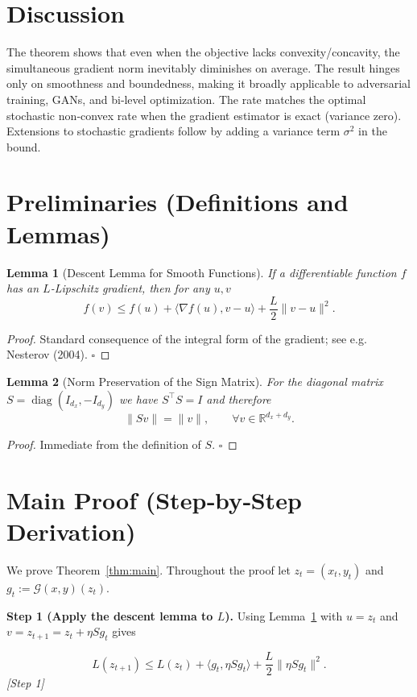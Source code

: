 \documentclass{article}
\newtheorem{lemma}{Lemma}
\newcommand{\G}{\mathcal{G}(x,y)}
\begin{document}
\section*{Discussion}
The theorem shows that even when the objective lacks convexity/concavity, the simultaneous gradient norm inevitably diminishes on average. The result hinges only on smoothness and boundedness, making it broadly applicable to adversarial training, GANs, and bi‑level optimization. The rate matches the optimal stochastic non‑convex rate when the gradient estimator is exact (variance zero). Extensions to stochastic gradients follow by adding a variance term \(\sigma^2\) in the bound.

\newpage
\section*{Preliminaries (Definitions and Lemmas)}
\begin{lemma}[Descent Lemma for Smooth Functions]\label{lem:descent}
If a differentiable function \(f\) has an \(L\)-Lipschitz gradient, then for any \(u,v\)
\[
f(v)\le f(u)+\langle\nabla f(u),v-u\rangle+\frac{L}{2}\|v-u\|^2.
\tag{4}
\]
\end{lemma}
\begin{proof}
Standard consequence of the integral form of the gradient; see e.g. Nesterov (2004). \(\square\)
\end{proof}

\begin{lemma}[Norm Preservation of the Sign Matrix]\label{lem:sign}
For the diagonal matrix \(S=\operatorname{diag}(I_{d_x},-I_{d_y})\) we have \(S^{\top}S=I\) and therefore  
\[
\|S v\|=\|v\|,\qquad\forall v\in\mathbb{R}^{d_x+d_y}.
\tag{5}
\]
\end{lemma}
\begin{proof}
Immediate from the definition of \(S\). \(\square\)
\end{proof}

\section*{Main Proof (Step‑by‑Step Derivation)}
We prove Theorem~\ref{thm:main}. Throughout the proof let \(z_t=(x_t,y_t)\) and \(g_t:=\G(z_t)\).

\noindent\textbf{Step 1 (Apply the descent lemma to \(L\)).}  
Using Lemma~\ref{lem:descent} with \(u=z_t\) and \(v=z_{t+1}=z_t+\eta Sg_t\) gives  

\[
L(z_{t+1})\le L(z_t)+\langle g_t,\eta Sg_t\rangle+\frac{L}{2}\|\eta Sg_t\|^{2}.
\tag{6}
\]
\textit{[Step 1]}
\end{document}
